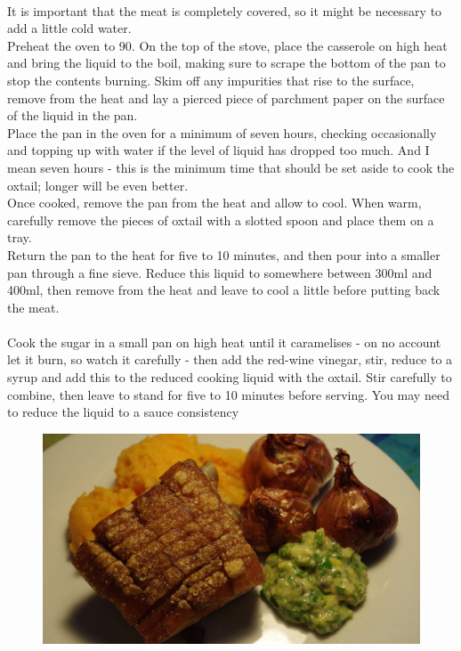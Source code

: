 \documentclass{tufte-book}
\begin{document}
\\It is important that the meat is completely covered, so it might be necessary to add a little cold water.
\\Preheat the oven to 90\celsius. On the top of the stove, place the casserole on high heat and bring the liquid to the boil, making sure to scrape the bottom of the pan to stop the contents burning. Skim off any impurities that rise to the surface, remove from the heat and lay a pierced piece of parchment paper on the surface of the liquid in the pan.
\\Place the pan in the oven for a minimum of seven hours, checking occasionally and topping up with water if the level of liquid has dropped too much. And I mean seven hours - this is the minimum time that should be set aside to cook the oxtail; longer will be even better.
\\Once cooked, remove the pan from the heat and allow to cool. When warm, carefully remove the pieces of oxtail with a slotted spoon and place them on a tray.
\\Return the pan to the heat for five to 10 minutes, and then pour into a smaller pan through a fine sieve. Reduce this liquid to somewhere between 300ml and 400ml, then remove from the heat and leave to cool a little before putting back the meat.
\\ 
\\Cook the sugar in a small pan on high heat until it caramelises - on no account let it burn, so watch it carefully - then add the red-wine vinegar, stir, reduce to a syrup and add this to the reduced cooking liquid with the oxtail. Stir carefully to combine, then leave to stand for five to 10 minutes before serving. You may need to reduce the liquid to a sauce consistency

\newpage

\begin{figure}[h]
  \includegraphics[width=\linewidth]{roastpork2}
\end{figure}
\end{document}
